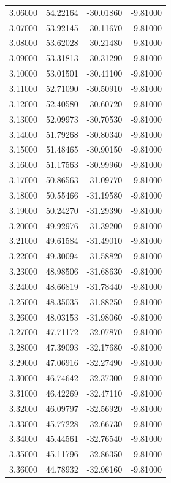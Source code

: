 \begin{table}
\begin{tabular}{llll}
3.06000 & 54.22164 & -30.01860 & -9.81000 \\
3.07000 & 53.92145 & -30.11670 & -9.81000 \\
3.08000 & 53.62028 & -30.21480 & -9.81000 \\
3.09000 & 53.31813 & -30.31290 & -9.81000 \\
3.10000 & 53.01501 & -30.41100 & -9.81000 \\
3.11000 & 52.71090 & -30.50910 & -9.81000 \\
3.12000 & 52.40580 & -30.60720 & -9.81000 \\
3.13000 & 52.09973 & -30.70530 & -9.81000 \\
3.14000 & 51.79268 & -30.80340 & -9.81000 \\
3.15000 & 51.48465 & -30.90150 & -9.81000 \\
3.16000 & 51.17563 & -30.99960 & -9.81000 \\
3.17000 & 50.86563 & -31.09770 & -9.81000 \\
3.18000 & 50.55466 & -31.19580 & -9.81000 \\
3.19000 & 50.24270 & -31.29390 & -9.81000 \\
3.20000 & 49.92976 & -31.39200 & -9.81000 \\
3.21000 & 49.61584 & -31.49010 & -9.81000 \\
3.22000 & 49.30094 & -31.58820 & -9.81000 \\
3.23000 & 48.98506 & -31.68630 & -9.81000 \\
3.24000 & 48.66819 & -31.78440 & -9.81000 \\
3.25000 & 48.35035 & -31.88250 & -9.81000 \\
3.26000 & 48.03153 & -31.98060 & -9.81000 \\
3.27000 & 47.71172 & -32.07870 & -9.81000 \\
3.28000 & 47.39093 & -32.17680 & -9.81000 \\
3.29000 & 47.06916 & -32.27490 & -9.81000 \\
3.30000 & 46.74642 & -32.37300 & -9.81000 \\
3.31000 & 46.42269 & -32.47110 & -9.81000 \\
3.32000 & 46.09797 & -32.56920 & -9.81000 \\
3.33000 & 45.77228 & -32.66730 & -9.81000 \\
3.34000 & 45.44561 & -32.76540 & -9.81000 \\
3.35000 & 45.11796 & -32.86350 & -9.81000 \\
3.36000 & 44.78932 & -32.96160 & -9.81000 \\

\end{tabular}
\end{table}
